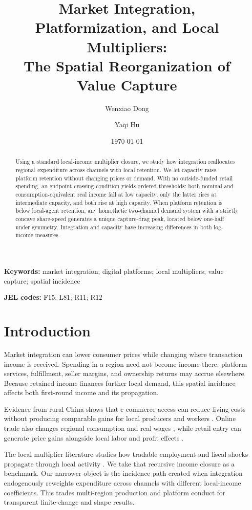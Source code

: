 \documentclass[11pt]{article}
\title{Market Integration, Platformization, and Local Multipliers:\\
The Spatial Reorganization of Value Capture}
\author{Wenxiao Dong \and Yaqi Hu}
\date{\today}
\theoremstyle{plain}
\theoremstyle{definition}
\begin{document}
\maketitle

\begin{abstract}
Using a standard local-income multiplier closure, we study how integration
reallocates regional expenditure across channels with local
retention. We let capacity raise platform retention without changing prices or
demand. With no outside-funded retail spending, an endpoint-crossing condition
yields ordered thresholds: both nominal and consumption-equivalent real income fall
at low capacity, only the latter rises at intermediate capacity, and both rise
at high capacity. When platform retention is below local-agent retention, any
homothetic two-channel demand system with a strictly concave share-speed
generates a unique capture-drag peak, located below one-half under symmetry.
Integration and capacity have increasing differences in both log-income
measures.
\end{abstract}

\noindent\textbf{Keywords:} market integration; digital platforms; local
multipliers; value capture; spatial incidence

\medskip
\noindent\textbf{JEL codes:} F15; L81; R11; R12

\section{Introduction}
\label{sec:introduction}

Market integration can lower consumer prices while changing where transaction
income is received. Spending in a region need not become income there:
platform services, fulfillment, seller margins, and ownership returns may
accrue elsewhere. Because retained income finances further local demand, this
spatial incidence affects both first-round income and its propagation.

Evidence from rural China shows that e-commerce access can reduce living costs
without producing comparable gains for local producers and workers
\citep{couture2021connecting}. Online trade also changes regional consumption
and real wages \citep{fan2018alibaba}, while retail entry can generate price
gains alongside local labor and profit effects \citep{atkin2018retail}.

The local-multiplier literature studies how tradable-employment and fiscal
shocks propagate through local activity
\citep{moretti2010local,chodorowreich2019geographic}. We take that recursive
income closure as a benchmark. Our narrower object is the incidence path
created when integration endogenously reweights expenditure across channels
with different local-income coefficients. This trades multi-region production
and platform conduct for transparent finite-change and shape results.
\end{document}

